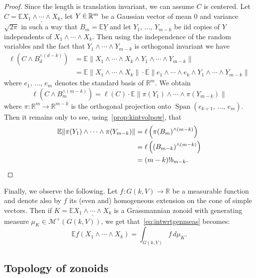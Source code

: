 \documentclass[10pt]{amsart}
\theoremstyle{definition}\newtheorem{defi}[theo]{Definition}\newtheorem{rema}[theo]{Remark}\newtheorem{exam}[theo]{Example}\newtheorem{exem}[theo]{Example}\newtheorem{nota}[theo]{Notation}
\newcommand{\R}{\mathbb{R}}
\newcommand{\EE}{\mathbb{E}}
\DeclareMathOperator{\Span}{Span}
\newcommand{\Me}{\mathcal{M}}
\newcommand{\seg}{\underline}
\newcommand{\uball}{b}
\newcommand*\randin{
\mathchoice {\raisebox{-.35ex}{$\displaystyle{^\subset}$}\mkern-11.5mu\raisebox{+.45ex}{$\displaystyle{_\subset}$}} {\mkern+1mu\raisebox{-.27ex}{$\textstyle{^\subset}$}\mkern-11.7mu\raisebox{+.45ex}{$\textstyle{_\subset}$}} {\raisebox{.35ex}{$\scriptstyle\subset$}\mkern-14mu\raisebox{-.15ex}{$\scriptstyle\subset$}} {\raisebox{.3ex}{$\scriptscriptstyle\subset$}\mkern-13.5mu\raisebox{-.10ex}{$\scriptscriptstyle\subset$}}}
\begin{document}
\begin{proof}
Since the length is translation invariant, we can assume $C$ is centered. Let $C=\EE\seg{X_1\wedge\cdots\wedge X_k}$, let $Y\,\randin\,\R^m$ be a Gaussian vector of mean $0$ and variance $\sqrt{2\pi}$ in such a way that $B_m=\EE\seg{Y}$ and let $Y_1,\,\ldots,\,Y_{m-k}$ be iid copies of $Y$ independents of $X_1\wedge\cdots\wedge X_k$. Then using the independence of the random variables and the fact that $Y_1\wedge\cdots\wedge Y_{m-k}$ is orthogonal invariant we have
\begin{align*}
\ell\left(C\wedge B_d^{\wedge (d-k) }\right) &=\EE\|X_1\wedge\cdots\wedge X_k\wedge Y_1\wedge\cdots\wedge Y_{m-k}\| \\
&=\EE\|X_1\wedge\cdots\wedge X_k\|\cdot\EE\|e_1\wedge\cdots\wedge e_k\wedge Y_1\wedge\cdots\wedge Y_{m-k}\|
\end{align*}
where $e_1,\,\ldots,\,e_m$ denotes the standard basis of $\R^m$. We obtain
\begin{equation*}
\ell\left(C\wedge B_m^{\wedge (m-k) }\right)=\ell(C)\cdot\EE\| \pi(Y_1)\wedge\cdots\wedge \pi(Y_{m-k})\|
\end{equation*}
where $\pi:\R^m\to\R^{m-k}$ is the orthogonal projection onto $\Span(e_{k+1},\,\ldots,\,e_m)$. Then it remains only to see, using~\cref{prop:kintvolpow}, that
\begin{align*}
\EE\| \pi(Y_1)\wedge\cdots\wedge \pi(Y_{m-k})\|&=\ell\left(\pi(B_m)^{\wedge{(m-k)}}\right)\\
&=\ell\left((B_{m-k})^{\wedge{(m-k)}}\right)\\
&= (m-k)!\uball_{m-k}.\qedhere
\end{align*}
\end{proof}

Finally, we observe the following. Let $f:G(k,V)\to \R$ be a measurable function and denote also by $f$ its (even and) homogeneous extension on the cone of simple vectors. Then if $K=\EE\seg{X_1\wedge\cdots\wedge X_k}$ is a Grassmannian zonoid with generating measure $\mu_K\in\Me^+(G(k,V))$, we get that~\eqref{eq:intwrtgenmeas} becomes:
\begin{equation}\label{eq:intwrtgenmeasgrass}
\EE f(X_1\wedge\cdots\wedge X_k)=\int_{G(k,V)}f\, d\mu_K.
\end{equation}



\subsection{Topology of zonoids}\label{sub:zonoidbundles}
\end{document}
